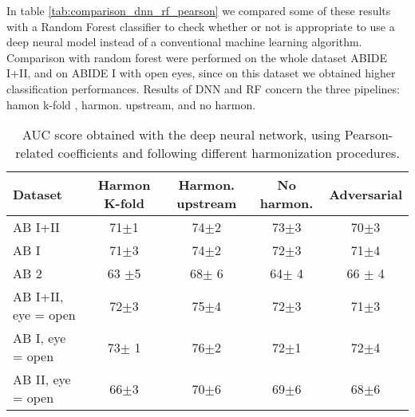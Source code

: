 \documentclass[11pt]{report}
\begin{document}
In table \ref{tab:comparison_dnn_rf_pearson} we compared some of these results with a Random Forest classifier to check whether or not is appropriate to use a deep neural model instead of a conventional machine learning algorithm.
Comparison with random forest were performed on the whole dataset ABIDE I+II, and on ABIDE I with open eyes, since on this dataset we obtained higher classification performances. 
Results of DNN and RF concern the three pipelines: hamon k-fold , harmon. upstream, and no harmon.








\begin{table}[!htp]
\centering
\begin{tabular}{|lcccc|}
\hline
Dataset &Harmon K-fold &Harmon. upstream &No harmon. &Adversarial \\
\hline
AB I+II &71$\pm$1 &74$\pm$2 &73$\pm$3 &70$\pm$3 \\
AB I &71$\pm$3 &74$\pm$2 &72$\pm$3 &71$\pm$4 \\
AB 2 &63 $\pm$5 &68$\pm$ 6 &64$\pm$ 4 &66 $\pm$ 4 \\
AB I+II, eye = open &72$\pm$3 &75$\pm$4 &72$\pm$3 &71$\pm$3 \\
AB I, eye = open &73$\pm$ 1 &76$\pm$2 &72$\pm$1 &72$\pm$4 \\
AB II, eye = open  &66$\pm$3 &70$\pm$6 &69$\pm$6 &68$\pm$6 \\
\hline
\end{tabular}
\caption{AUC score obtained with the deep neural network, using Pearson-related coefficients and following different harmonization procedures.}
\label{tab:classification_pearson}
\end{table}
\end{document}
